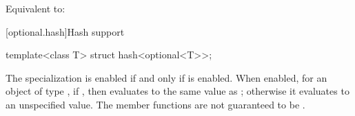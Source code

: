 \begin{itemdescr}
\pnum
\effects
Equivalent to: 
\end{itemdescr}

[optional.hash]{Hash support}

%
\begin{itemdecl}
template<class T> struct hash<optional<T>>;
\end{itemdecl}

\begin{itemdescr}
\pnum
The specialization  is enabled
if and only if  is enabled.
When enabled, for an object  of type ,
if , then 
evaluates to the same value as ;
otherwise it evaluates to an unspecified value.
The member functions are not guaranteed to be .
\end{itemdescr}

